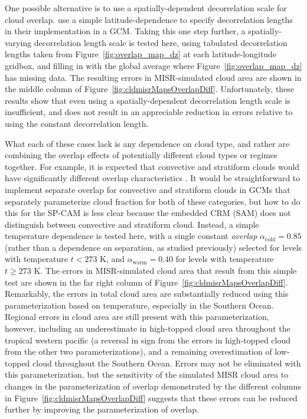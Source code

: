 One possible alternative is to use a spatially-dependent decorrelation
scale for cloud overlap. \citep{oreopoulos_et_al_2012} use a simple
latitude-dependence to specify decorrelation lengths in their
implementation in a GCM. Taking this one step further, a
spatially-varying decorrelation length scale is tested here, using
tabulated decorrelation lengths taken from
Figure~\ref{fig:overlap_map_dz} at each latitude-longitude gridbox, and
filling in with the global average where Figure~\ref{fig:overlap_map_dz}
has missing data. The resulting errors in MISR-simulated cloud area are
shown in the middle column of Figure~\ref{fig:cldmisrMapsOverlapDiff}.
Unfortunately, these results show that even using a spatially-dependent
decorrelation length scale is insufficient, and does not result in an
appreciable reduction in errors relative to using the constant
decorrelation length.

What each of these cases lack is any dependence on cloud type, and
rather are combining the overlap effects of potentially different cloud
types or regimes together. For example, it is expected that convective
and stratiform clouds would have significantly different overlap
characteristics \citep[e.g.,][]{pincus_et_al_2005}. It would be
straightforward to implement separate overlap for convective and
stratiform clouds in GCMs that separately parameterize cloud fraction
for both of these categories, but how to do this for the SP-CAM is less
clear because the embedded CRM (SAM) does not distinguish between
convective and stratiform cloud. Instead, a simple temperature
dependence is tested here, with a single constant \emph{overlap}
\(\alpha_\textrm{cold} = 0.85\) (rather than a dependence on separation,
as studied previously) selected for levels with temperature \(t < 273\)
K, and \(\alpha_\textrm{warm} = 0.40\) for levels with temperature
\(t \ge 273\) K. The errors in MISR-simulated cloud area that result
from this simple test are shown in the far right column of
Figure~\ref{fig:cldmisrMapsOverlapDiff}. Remarkably, the errors in total
cloud area are substantially reduced using this parameterization based
on temperature, especially in the Southern Ocean. Regional errors in
cloud area are still present with this parameterization, however,
including an underestimate in high-topped cloud area throughout the
tropical western pacific (a reversal in sign from the errors in
high-topped cloud from the other two parameterizations), and a remaining
overestimation of low-topped cloud throughout the Southern Ocean. Errors
may not be eliminated with this parameterization, but the sensitivity of
the simulated MISR cloud area to changes in the parameterization of
overlap demonstrated by the different columns in
Figure~\ref{fig:cldmisrMapsOverlapDiff} suggests that these errors can
be reduced further by improving the parameterization of overlap.

